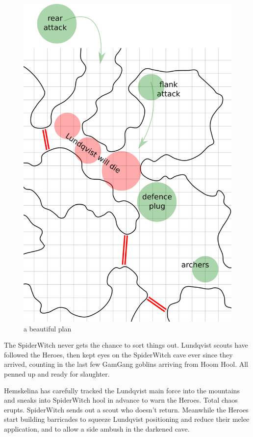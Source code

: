 \begin{figure}    %
\centering
\includegraphics[width=0.9\linewidth]{./fig/hool2lundqvistplan-zoom.png}
\caption*{a beautiful plan}
\end{figure}

The SpiderWitch never gets the chance to sort things out. Lundqvist scouts have followed the Heroes, then kept eyes on the SpiderWitch cave ever since they arrived, counting in the last few GamGang goblins arriving from Hoom Hool. All penned up and ready for slaughter.

Hemskelina has carefully tracked the Lundqvist main force into the mountains and sneaks into SpiderWitch hool in advance to warn the Heroes. Total chaos erupts. SpiderWitch sends out a scout who doesn't return. Meanwhile the Heroes start building barricades to squeeze Lundqvist positioning and reduce their melee application, and to allow a side ambush in the darkened cave.

